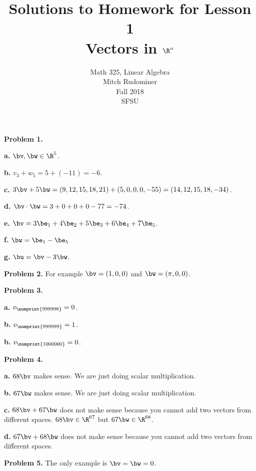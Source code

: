 \documentclass[oneside,12pt]{amsart}
\begin{document}
\title{Solutions to Homework for Lesson 1 \\ Vectors in $\R^n$}
\author{Math 325, Linear Algebra \\ Mitch Rudominer \\ Fall 2018 \\ SFSU }
\date{}

\maketitle


\textbf{Problem 1.}

\textbf{a.} $\bv, \bw \in \R^5$.

\textbf{b.} $v_3 + w_5 = 5 + (-11) = -6$.

\textbf{c.} $3 \bv + 5 \bw = (9, 12, 15, 18, 21) + (5, 0, 0, 0, -55) = (14, 12, 15, 18, -34)$.

\textbf{d.} $\bv \cdot \bw = 3 + 0 + 0 + 0 - 77 = -74$.


\textbf{e.} $\bv = 3\be_1 + 4\be_2 + 5\be_3 +6\be_4 + 7\be_5$.

\textbf{f.} $\bw = \be_1 - \be_5$

\textbf{g.} $\bu = \bv - 3\bw$.

\smallskip

\textbf{Problem 2.} For example $\bv = (1, 0, 0)$ and $\bw = (\pi, 0, 0)$.

\smallskip

\textbf{Problem 3.}

\textbf{a.} $v_{\numprint{999998}} = 0$.

\textbf{b.} $v_{\numprint{999999}} = 1$.

\textbf{b.} $v_{\numprint{1000000}} = 0$.

\smallskip

\textbf{Problem 4.}

\textbf{a.} $68 \bv$ makes sense. We are just doing scalar multiplication.

\textbf{b.} $67 \bw$ makes sense. We are just doing scalar multiplication.

\textbf{c.} $68 \bv + 67 \bw$ does not make sense because you cannot add
two vectors from different spaces. $68 \bv \in \R^{67}$ but
$67 \bw \in \R^{68}$.


\textbf{d.} $67 \bv + 68 \bw$ does not make sense because you cannot add two
vectors from different spaces.


\smallskip

\textbf{Problem 5.} The only example is $\bv = \bw = 0$.
\end{document}
